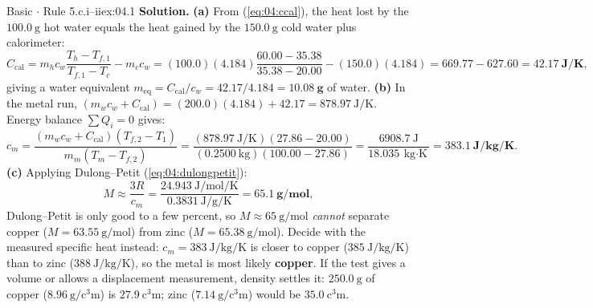 \begin{workedexample}{Basic $\cdot$ Rule 5.c.i--ii}{ex:04.1}
\textbf{Solution.}
\textbf{(a)} From (\ref{eq:04:ccal}), the heat lost by the $\SI{100.0}{\gram}$ hot water equals the heat gained by the $\SI{150.0}{\gram}$ cold water plus calorimeter:
\[
  C_{\mathrm{cal}} = m_h c_w \frac{T_h - T_{f,1}}{T_{f,1} - T_c} - m_c c_w = (100.0)(4.184)\frac{60.00 - 35.38}{35.38 - 20.00} - (150.0)(4.184) = 669.77 - 627.60 = \mathbf{\SI{42.17}{\joule\per\kelvin}},
\]
giving a water equivalent $m_{\mathrm{eq}} = C_{\mathrm{cal}}/c_w = 42.17/4.184 = \mathbf{\SI{10.08}{\gram}}$ of water.
\textbf{(b)} In the metal run, $(m_w c_w + C_{\mathrm{cal}}) = (200.0)(4.184) + 42.17 = \SI{878.97}{\joule\per\kelvin}$. Energy balance $\sum Q_i = 0$ gives:
\[
  c_m = \frac{(m_w c_w + C_{\mathrm{cal}})(T_{f,2} - T_1)}{m_m(T_m - T_{f,2})} = \frac{(\SI{878.97}{\joule\per\kelvin})(27.86 - 20.00)}{(\SI{0.2500}{\kilogram})(100.00 - 27.86)} = \frac{\SI{6908.7}{\joule}}{\SI{18.035}{\kilogram\cdot\kelvin}} = \mathbf{\SI{383.1}{\joule\per\kilogram\per\kelvin}}.
\]
\textbf{(c)} Applying Dulong--Petit (\ref{eq:04:dulongpetit}):
\[
  M \approx \frac{3R}{c_m} = \frac{\SI{24.943}{\joule\per\mole\per\kelvin}}{\SI{0.3831}{\joule\per\gram\per\kelvin}} = \mathbf{\SI{65.1}{\gram\per\mole}},
\]
Dulong--Petit is only good to a few percent, so $M \approx \SI{65}{\gram\per\mole}$ \emph{cannot} separate copper ($M = \SI{63.55}{\gram\per\mole}$) from zinc ($M = \SI{65.38}{\gram\per\mole}$). Decide with the measured specific heat instead: $c_m = \SI{383}{\joule\per\kilogram\per\kelvin}$ is closer to copper ($\SI{385}{\joule\per\kilogram\per\kelvin}$) than to zinc ($\SI{388}{\joule\per\kilogram\per\kelvin}$), so the metal is most likely \textbf{copper}. If the test gives a volume or allows a displacement measurement, density settles it: $\SI{250.0}{\gram}$ of copper ($\SI{8.96}{\gram\per\cubic\centi\meter}$) is $\SI{27.9}{\cubic\centi\meter}$; zinc ($\SI{7.14}{\gram\per\cubic\centi\meter}$) would be $\SI{35.0}{\cubic\centi\meter}$.
\end{workedexample}

